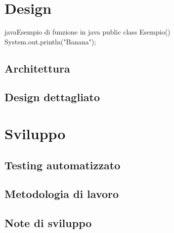 \documentclass[a4paper, italian, 11pt, oneside]{report}
\begin{document}
\chapter{Design}

\begin{mintedcodebox}{java}{Esempio di funzione in java}
  public class Esempio() {
    System.out.println("Banana");
  }
\end{mintedcodebox}

\section{Architettura}

\section{Design dettagliato}

\chapter{Sviluppo}

\section{Testing automatizzato}

\section{Metodologia di lavoro}

\section{Note di sviluppo}
\end{document}
